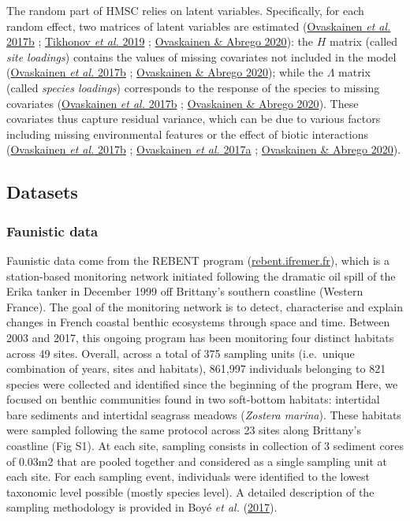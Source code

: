 \documentclass[9pt,biorxiv,doublespacing,lineno,endfloat]{lapreprint}
\begin{document}
The random part of HMSC relies on latent variables. Specifically, for
each random effect, two matrices of latent variables are estimated
(\protect\hyperlink{ref-Ovaskainen_2017a}{Ovaskainen \emph{et al.}
2017b} ; \protect\hyperlink{ref-Tikhonov_2019b}{Tikhonov \emph{et al.}
2019} ; \protect\hyperlink{ref-Ovaskainen_2020}{Ovaskainen \& Abrego
2020}): the \(H\) matrix (called \emph{site loadings}) contains the
values of missing covariates not included in the model
(\protect\hyperlink{ref-Ovaskainen_2017a}{Ovaskainen \emph{et al.}
2017b} ; \protect\hyperlink{ref-Ovaskainen_2020}{Ovaskainen \& Abrego
2020}); while the \(\Lambda\) matrix (called \emph{species loadings})
corresponds to the response of the species to missing covariates
(\protect\hyperlink{ref-Ovaskainen_2017a}{Ovaskainen \emph{et al.}
2017b} ; \protect\hyperlink{ref-Ovaskainen_2020}{Ovaskainen \& Abrego
2020}). These covariates thus capture residual variance, which can be
due to various factors including missing environmental features or the
effect of biotic interactions
(\protect\hyperlink{ref-Ovaskainen_2017a}{Ovaskainen \emph{et al.}
2017b} ; \protect\hyperlink{ref-Ovaskainen_2017b}{Ovaskainen \emph{et
al.} 2017a} ; \protect\hyperlink{ref-Ovaskainen_2020}{Ovaskainen \&
Abrego 2020}).

\hypertarget{datasets}{%
\subsection{Datasets}\label{datasets}}

\hypertarget{faunistic-data}{%
\subsubsection{Faunistic data}\label{faunistic-data}}

Faunistic data come from the REBENT program
(\href{https://rebent.ifremer.fr}{rebent.ifremer.fr}), which is a
station-based monitoring network initiated following the dramatic oil
spill of the Erika tanker in December 1999 off Brittany's southern
coastline (Western France). The goal of the monitoring network is to
detect, characterise and explain changes in French coastal benthic
ecosystems through space and time. Between 2003 and 2017, this ongoing
program has been monitoring four distinct habitats across 49 sites.
Overall, across a total of 375 sampling units (i.e.~unique combination
of years, sites and habitats), 861,997 individuals belonging to 821
species were collected and identified since the beginning of the program
Here, we focused on benthic communities found in two soft-bottom
habitats: intertidal bare sediments and intertidal seagrass meadows
(\emph{Zostera marina}). These habitats were sampled following the same
protocol across 23 sites along Brittany's coastline (Fig S1). At each
site, sampling consists in collection of 3 sediment cores of 0.03m2 that
are pooled together and considered as a single sampling unit at each
site. For each sampling event, individuals were identified to the lowest
taxonomic level possible (mostly species level). A detailed description
of the sampling methodology is provided in Boyé \emph{et al.}
(\protect\hyperlink{ref-Boye_2017}{2017}).
\end{document}
